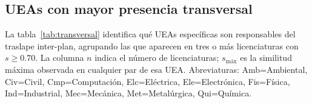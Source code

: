 \documentclass[11pt,a4paper]{article}
\begin{document}
\subsection{UEAs con mayor presencia transversal}
\label{sec:transversal}

La tabla~\ref{tab:transversal} identifica qué UEAs específicas son responsables del traslape inter-plan, agrupando las que aparecen en tres o más licenciaturas con $s \geq 0.70$.
La columna $n$ indica el número de licenciaturas; $s_\text{máx}$ es la similitud máxima observada en cualquier par de esa UEA.
Abreviaturas: \textsf{Amb}=Ambiental, \textsf{Civ}=Civil, \textsf{Cmp}=Computación, \textsf{Elc}=Eléctrica, \textsf{Ele}=Electrónica, \textsf{Fis}=Física, \textsf{Ind}=Industrial, \textsf{Mec}=Mecánica, \textsf{Met}=Metalúrgica, \textsf{Qui}=Química.
\end{document}
